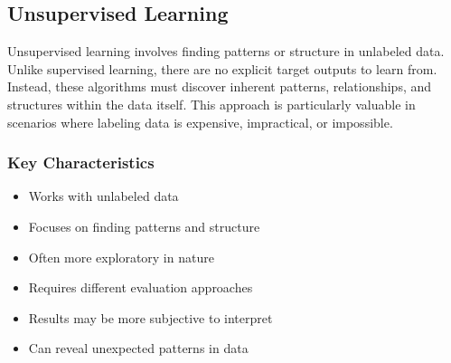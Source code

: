 \subsection{Unsupervised Learning}

\noindent
Unsupervised learning involves finding patterns or structure in unlabeled data. Unlike supervised learning, there are no explicit target outputs to learn from. Instead, these algorithms must discover inherent patterns, relationships, and structures within the data itself. This approach is particularly valuable in scenarios where labeling data is expensive, impractical, or impossible.

\subsubsection{Key Characteristics}
\begin{itemize}[noitemsep]
    \item Works with unlabeled data
    \item Focuses on finding patterns and structure
    \item Often more exploratory in nature
    \item Requires different evaluation approaches
    \item Results may be more subjective to interpret
    \item Can reveal unexpected patterns in data
\end{itemize}

